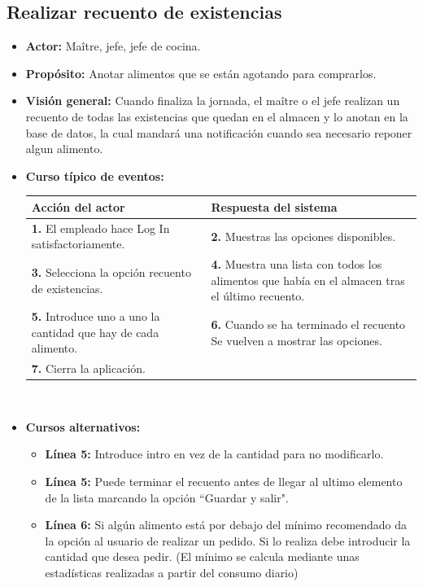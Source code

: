\documentclass[spanish,a4paper,11pt, twoside]{report}	%
\begin{document}
	\subsection{Realizar recuento de existencias}
			\begin{itemize}
			\item \textbf{Actor:} Maître, jefe, jefe de cocina.
			\item \textbf{Propósito: } Anotar alimentos que se están agotando para comprarlos.
			\item \textbf{Visión general:} Cuando finaliza la jornada, el maître o el jefe realizan un recuento de todas las existencias que quedan en el almacen y lo anotan en la base de datos, la cual mandará una notificación cuando sea necesario reponer algun alimento.
			\item \textbf{Curso típico de eventos:} 	\\
				\begin{tabular}{|p{6cm}||p{6cm}|}
				\hline
				\textbf{Acción del actor} & \textbf{Respuesta del sistema} \\ \hline
				\textbf{1.} El empleado hace Log In satisfactoriamente. & \textbf{2.} Muestras las opciones disponibles. \\ \hline
				\textbf{3.} Selecciona la opción recuento de existencias. & \textbf{4.} Muestra una lista con todos los alimentos que había en el almacen tras el último recuento. \\ \hline
				\textbf{5.} Introduce uno a uno la cantidad que hay de cada alimento. & \textbf{6.} Cuando se ha terminado el recuento Se vuelven a mostrar las opciones. \\ \hline
				\textbf{7.}  Cierra la aplicación. &   \\ \hline
			\end{tabular}
			\\
			\item \textbf{Cursos alternativos:} 
			\begin{itemize}
			\item  \textbf{Línea 5:} Introduce intro en vez de la cantidad para no modificarlo.
			\item  \textbf{Línea 5:} Puede terminar el recuento antes de llegar al ultimo elemento de la lista marcando la opción “Guardar y salir".
			\item  \textbf{Línea 6:} Si algún alimento está por debajo del mínimo recomendado da la opción al usuario de realizar un pedido. Si lo realiza debe introducir la cantidad que desea pedir. (El mínimo se calcula mediante unas estadísticas realizadas a partir del consumo diario)
			\end {itemize}
		\end {itemize}
\end{document}
